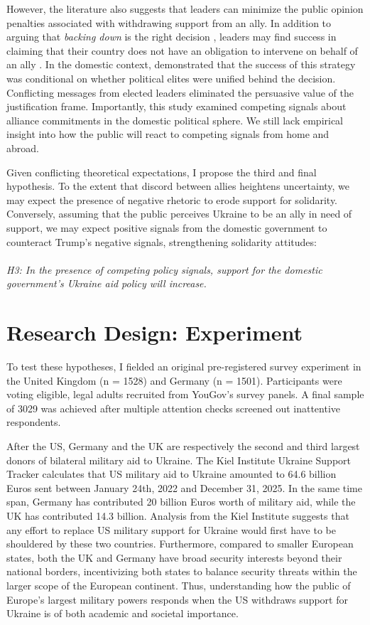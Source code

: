 However, the literature also suggests that leaders can minimize the public opinion penalties associated with withdrawing support from an ally. In addition to arguing that \emph{backing down} is the right decision \autocite{levendusky_when_2012}, leaders may find success in claiming that their country does not have an obligation to intervene on behalf of an ally \autocite{reiter_manipulating_2024}. In the domestic context, \textcite{reiter_manipulating_2024} demonstrated that the success of this strategy was conditional on whether political elites were unified behind the decision. Conflicting messages from elected leaders eliminated the persuasive value of the justification frame. Importantly, this study examined competing signals about alliance commitments in the domestic political sphere. We still lack empirical insight into how the public will react to competing signals from home and abroad.

Given conflicting theoretical expectations, I propose the third and final hypothesis. To the extent that discord between allies heightens uncertainty, we may expect the presence of negative rhetoric to erode support for solidarity. Conversely, assuming that the public perceives Ukraine to be an ally in need of support, we may expect positive signals from the domestic government to counteract Trump's negative signals, strengthening solidarity attitudes:
\paragraph{}
\textit{H3: In the presence of competing policy signals, support for the domestic government’s Ukraine aid policy will increase.}

\section{Research Design: Experiment}
To test these hypotheses, I fielded an original pre-registered survey experiment in the United Kingdom (n = 1528) and Germany (n = 1501). Participants were voting eligible, legal adults recruited from YouGov's survey panels. A final sample of 3029 was achieved after multiple attention checks screened out inattentive respondents.  

After the US, Germany and the UK are respectively the second and third largest donors of bilateral military aid to Ukraine. The Kiel Institute Ukraine Support Tracker calculates that US military aid to Ukraine amounted to 64.6 billion Euros sent between January 24th, 2022 and December 31, 2025. In the same time span, Germany has contributed 20 billion Euros worth of military aid, while the UK has contributed 14.3 billion. Analysis from the Kiel Institute suggests that any effort to replace US military support for Ukraine would first have to be shouldered by these two countries. \autocite{irto_ukraine_2025} Furthermore, compared to smaller European states, both the UK and Germany have broad security interests beyond their national borders, incentivizing both states to balance security threats within the larger scope of the European continent. 
Thus, understanding how the public of Europe's largest military powers responds when the US withdraws support for Ukraine is of both academic and societal importance. 

